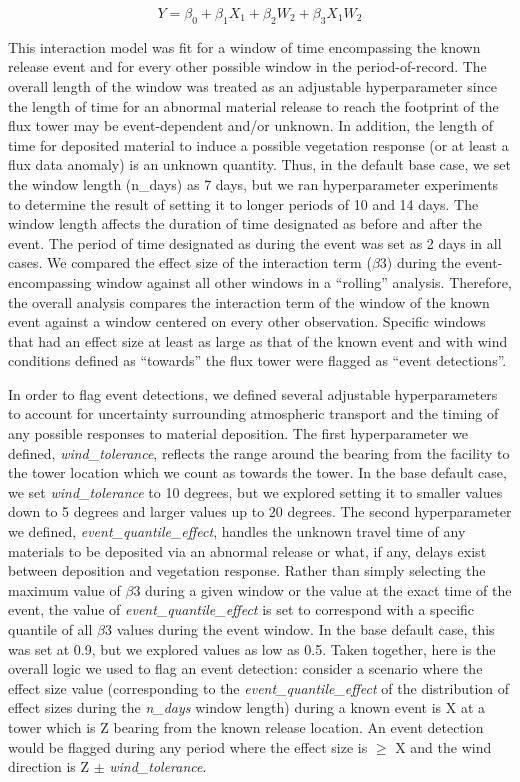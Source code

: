 \documentclass{article}
\begin{document}
\[ Y = \beta_0 + \beta_1X_1 + \beta_2W_2 + \beta_3X_1W_2 \]

This interaction model was fit for a window of time encompassing the known release event and for every other possible window in the period-of-record. The overall length of the window was treated as an adjustable hyperparameter since the length of time for an abnormal material release to reach the footprint of the flux tower may be event-dependent and/or unknown. In addition, the length of time for deposited material to induce a possible vegetation response (or at least a flux data anomaly) is an unknown quantity. Thus, in the default base case, we set the window length (n\_days) as 7 days, but we ran hyperparameter experiments to determine the result of setting it to longer periods of 10 and 14 days. The window length affects the duration of time designated as before and after the event. The period of time designated as during the event was set as 2 days in all cases. We compared the effect size of the interaction term ($\beta$3) during the event-encompassing window against all other windows in a “rolling” analysis. Therefore, the overall analysis compares the interaction term of the window of the known event against a window centered on every other observation. Specific windows that had an effect size at least as large as that of the known event and with wind conditions defined as “towards” the flux tower were flagged as “event detections”.

In order to flag event detections, we defined several adjustable hyperparameters to account for uncertainty surrounding atmospheric transport and the timing of any possible responses to material deposition. The first hyperparameter we defined, \emph{wind\_tolerance}, reflects the range around the bearing from the facility to the tower location which we count as towards the tower. In the base default case, we set \emph{wind\_tolerance} to 10 degrees, but we explored setting it to smaller values down to 5 degrees and larger values up to 20 degrees. The second hyperparameter we defined, \emph{event\_quantile\_effect}, handles the unknown travel time of any materials to be deposited via an abnormal release or what, if any, delays exist between deposition and vegetation response. Rather than simply selecting the maximum value of $\beta$3 during a given window or the value at the exact time of the event, the value of \emph{event\_quantile\_effect} is set to correspond with a specific quantile of all $\beta$3 values during the event window. In the base default case, this was set at 0.9, but we explored values as low as 0.5. Taken together, here is the overall logic we used to flag an event detection: consider a scenario where the effect size value (corresponding to the \emph{event\_quantile\_effect} of the distribution of effect sizes during the \emph{n\_days} window length) during a known event is X at a tower which is Z bearing from the known release location. An event detection would be flagged during any period where the effect size is $\geq$ X and the wind direction is Z $\pm$ \emph{wind\_tolerance}.
\end{document}
